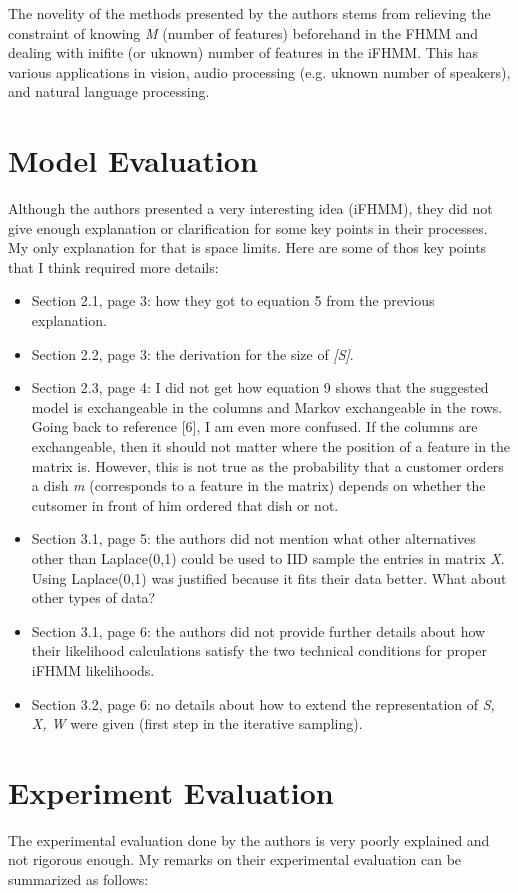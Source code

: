 \documentclass[11pt,a4paper]{article}
\begin{document}
The novelity of the methods presented by the authors stems from relieving the constraint of knowing \textit{M} (number of features) beforehand in the FHMM and
dealing with inifite (or uknown) number of features in the iFHMM. This has various applications in vision, audio processing (e.g. uknown number of speakers),
and natural language processing.

\section{Model Evaluation}
Although the authors presented a very interesting idea (iFHMM), they did not give enough explanation or clarification for some key points in their processes.
My only explanation for that is space limits. Here are some of thos key points that I think required more details:

\begin{itemize}
 \item Section 2.1, page 3: how they got to equation 5 from the previous explanation.
 \item Section 2.2, page 3: the derivation for the size of \textit{[S]}.
 \item Section 2.3, page 4: I did not get how equation 9 shows that the suggested model is exchangeable in the columns and Markov exchangeable in the rows.
Going back to reference [6], I am even more confused. If the columns are exchangeable, then it should not matter where the position of a feature in the matrix
is. However, this is not true as the probability that a customer orders a dish \textit{m} (corresponds to a feature in the matrix) depends on whether the
cutsomer in front of him ordered that dish or not.
 \item Section 3.1, page 5: the authors did not mention what other alternatives other than Laplace(0,1) could be used to IID sample the entries in matrix
\textit{X}. Using Laplace(0,1) was justified because it fits their data better. What about other types of data?
 \item Section 3.1, page 6: the authors did not provide further details about how their likelihood calculations satisfy the two technical conditions for proper
iFHMM likelihoods.
 \item Section 3.2, page 6: no details about how to extend the representation of \textit{S, X, W} were given (first step in the iterative sampling).
\end{itemize}

\section{Experiment Evaluation}
The experimental evaluation done by the authors is very poorly explained and not rigorous enough. My remarks on their experimental evaluation can be summarized
as follows:
\end{document}
